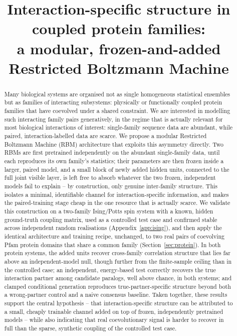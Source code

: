 \documentclass[11pt]{article}
\title{Interaction-specific structure in coupled protein families:\\
a modular, frozen-and-added Restricted Boltzmann Machine}
\author{}
\date{}
\begin{document}
\maketitle

\begin{abstract}
Many biological systems are organised not as single homogeneous
statistical ensembles but as families of interacting subsystems:
physically or functionally coupled protein families that have coevolved
under a shared constraint. We are interested in modelling such
interacting family pairs generatively, in the regime that is actually
relevant for most biological interactions of interest: single-family
sequence data are abundant, while paired, interaction-labelled data are
scarce. We propose a modular Restricted Boltzmann Machine (RBM)
architecture that exploits this asymmetry directly. Two RBMs are first
pretrained independently on the abundant single-family data, until each
reproduces its own family's statistics; their parameters are then frozen
inside a larger, paired model, and a small block of newly added hidden
units, connected to the full joint visible layer, is left free to absorb
whatever the two frozen, independent models fail to explain -- by
construction, only genuine inter-family structure. This isolates a
minimal, identifiable channel for interaction-specific information, and
makes the paired-training stage cheap in the one resource that is
actually scarce. We validate this construction on a two-family Ising/Potts spin system with
a known, hidden ground-truth coupling matrix, used as a controlled test
case and confirmed stable across independent random realisations
(Appendix~\ref{app:ising}), and then apply the identical architecture and
training recipe, unchanged, to two real pairs of coevolving Pfam protein
domains that share a common family (Section~\ref{sec:protein}). In both
protein systems, the added units recover cross-family correlation
structure that lies far above an independent-model null, though further
from the finite-sample ceiling than in the controlled case; an
independent, energy-based test correctly recovers the true interaction
partner among candidate paralogs, well above chance, in both systems; and
clamped conditional generation reproduces true-partner-specific structure
beyond both a wrong-partner control and a naive consensus baseline. Taken
together, these results support the central hypothesis -- that
interaction-specific structure can be attributed to a small, cheaply
trainable channel added on top of frozen, independently pretrained models
-- while also indicating that real coevolutionary signal is harder to
recover in full than the sparse, synthetic coupling of the controlled test
case.
\end{abstract}
\end{document}
